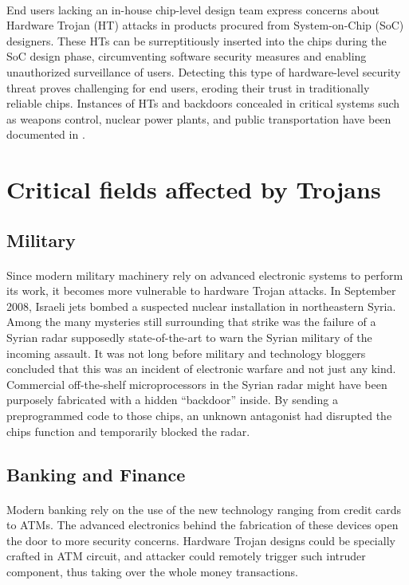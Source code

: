 \paragraph*{}
End users lacking an in-house chip-level design team express concerns about Hardware Trojan (HT) attacks in products procured from System-on-Chip (SoC) designers. These HTs can be surreptitiously inserted into the chips during the SoC design phase, circumventing software security measures and enabling unauthorized surveillance of users. Detecting this type of hardware-level security threat proves challenging for end users, eroding their trust in traditionally reliable chips. Instances of HTs and backdoors concealed in critical systems such as weapons control, nuclear power plants, and public transportation have been documented in \cite{skorobogatovhardware}.
\section{Critical fields affected by Trojans}
\subsection{Military}
\paragraph*{}
Since modern military machinery rely on advanced electronic systems to perform its work, it becomes more vulnerable to hardware Trojan attacks. In September 2008, Israeli jets bombed a suspected nuclear installation in northeastern Syria. Among the many mysteries still surrounding that strike was the failure of a Syrian radar supposedly state-of-the-art to warn the Syrian military of the incoming assault. It was not long before military and technology bloggers concluded that this was an incident of electronic warfare and not just any kind. Commercial off-the-shelf microprocessors in the Syrian radar might have been purposely fabricated with a hidden “backdoor” inside. By sending a preprogrammed code to those chips, an unknown antagonist had disrupted the chips function and temporarily blocked the radar.
\subsection{Banking and Finance}
\paragraph*{}
Modern banking rely on the use of the new technology ranging from credit cards to ATMs. The advanced electronics behind the fabrication of these devices open the door to more security concerns. Hardware Trojan designs could be specially crafted in ATM circuit, and attacker could remotely trigger such intruder component, thus taking over the whole money transactions.
